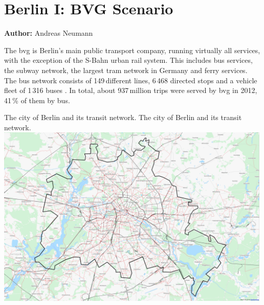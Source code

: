 \chapter{Berlin I: BVG Scenario}
\label{ch:berlinI}
\hfill \textbf{Author:} Andreas Neumann


The \gls{bvg} is Berlin's main public transport company, running virtually all services, with the exception of the S-Bahn urban rail system. This includes bus services, the subway network, the largest tram network in Germany and ferry services. The bus network consists of 149\,different lines, 6\,468 directed stops and a vehicle fleet of 1\,316 buses \citep{BVG2012}. In total, about 937\,million trips were served by \gls{bvg} in 2012, 41\,\% of them by bus.

\createfigure%
{The city of Berlin and its transit network.}%
{The city of Berlin and its transit network.}%
{\label{fig:scenario_berlin_i}}%
{\includegraphics[width=0.99\textwidth, angle=0]{scenarios/figures/berlin_pt}}%
{}

